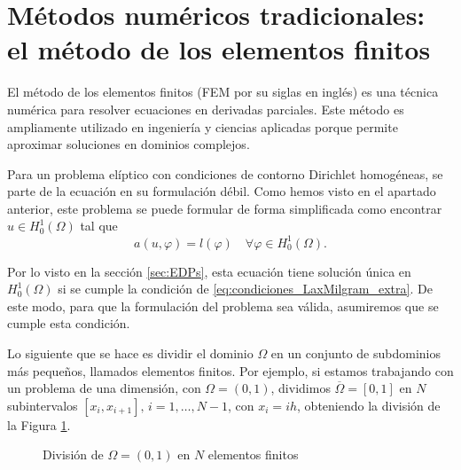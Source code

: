 \documentclass[a4paper,11pt,spanish, twoside, leqno]{tfg-uam}
\theoremstyle{definition}
\begin{document}
\section{Métodos numéricos tradicionales: el método de los elementos finitos}\label{sc:FEM}

El método de los elementos finitos (FEM por su siglas en inglés) es una técnica numérica para resolver ecuaciones en derivadas parciales. Este método es ampliamente utilizado en ingeniería y ciencias aplicadas porque permite aproximar soluciones en dominios complejos.

Para un problema elíptico con condiciones de contorno Dirichlet homogéneas, se parte de la ecuación en su formulación débil. Como hemos visto en el apartado anterior, este problema se puede formular de forma simplificada como encontrar $u\in H_0^1(\Omega)$ tal que
\begin{equation*}
    a(u,\varphi) = l(\varphi) \quad \forall \varphi\in  H_0^1(\Omega).
\end{equation*}

Por lo visto en la sección \ref{sec:EDPs}, esta ecuación tiene solución única en $H_0^1(\Omega)$ si se cumple la condición de \eqref{eq:condiciones_LaxMilgram_extra}. De este modo, para que la formulación del problema sea válida, asumiremos que se cumple esta condición.

Lo siguiente que se hace es dividir el dominio $\Omega$ en un conjunto de subdominios más pequeños, llamados elementos finitos. Por ejemplo, si estamos trabajando con un problema de una dimensión, con $\Omega =(0,1)$, dividimos $\overline{\Omega} = [0,1]$ en $N$ subintervalos $[x_i,x_{i+1}], \, i = 1, \dots, N-1$, con $x_i = ih$, obteniendo la división de la Figura \ref{fig:DivisionOmega}.

\begin{figure}
    \centering
    \caption{División de $\Omega = (0,1)$ en $N$ elementos finitos}
    \label{fig:DivisionOmega}
\end{figure}
\end{document}

